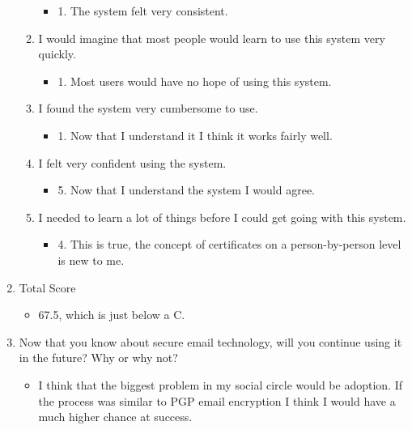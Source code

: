 \documentclass[11pt]{article}
\begin{document}
\begin{enumerate}
\begin{enumerate}
\begin{itemize}
\item 1. The system felt very consistent.
\end{itemize}
\item I would imagine that most people would learn to use this system very quickly.
\begin{itemize}
\item 1. Most users would have no hope of using this system.
\end{itemize}
\item I found the system very cumbersome to use.
\begin{itemize}
\item 1. Now that I understand it I think it works fairly well.
\end{itemize}
\item I felt very confident using the system.
\begin{itemize}
\item 5. Now that I understand the system I would agree.
\end{itemize}
\item I needed to learn a lot of things before I could get going with this system.
\begin{itemize}
\item 4. This is true, the concept of certificates on a person-by-person level is new to me.
\end{itemize}
\end{enumerate}
\item Total Score
\begin{itemize}
\item 67.5, which is just below a C.
\end{itemize}
\item Now that you know about secure email technology, will you continue using it in the future? Why or why not?
\begin{itemize}
\item I think that the biggest problem in my social circle would be adoption. If the process was similar to PGP email encryption I think I would have a much higher chance at success.
\end{itemize}
\end{enumerate}
\end{document}

